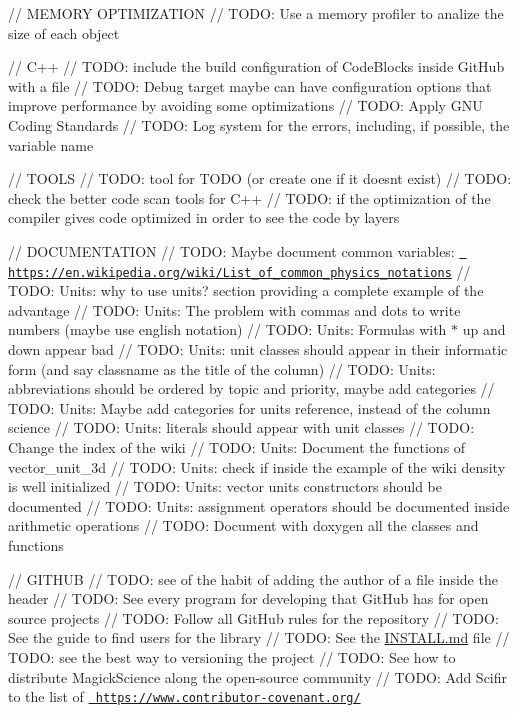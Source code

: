 // MEMORY OPTIMIZATION // TODO\+: Use a memory profiler to analize the size of each object

// C++ // TODO\+: include the build configuration of Code\+Blocks inside Git\+Hub with a file // TODO\+: Debug target maybe can have configuration options that improve performance by avoiding some optimizations // TODO\+: Apply GNU Coding Standards // TODO\+: Log system for the errors, including, if possible, the variable name

// TOOLS // TODO\+: tool for TODO (or create one if it doesn\textquotesingle{}t exist) // TODO\+: check the better code scan tools for C++ // TODO\+: if the optimization of the compiler gives code optimized in order to see the code by layers

// DOCUMENTATION // TODO\+: Maybe document common variables\+: \href{https://en.wikipedia.org/wiki/List_of_common_physics_notations}{\texttt{ https\+://en.\+wikipedia.\+org/wiki/\+List\+\_\+of\+\_\+common\+\_\+physics\+\_\+notations}} // TODO\+: Units\+: why to use units? section providing a complete example of the advantage // TODO\+: Units\+: The problem with commas and dots to write numbers (maybe use english notation) // TODO\+: Units\+: Formulas with $\ast$ up and down appear bad // TODO\+: Units\+: unit classes should appear in their informatic form (and say classname as the title of the column) // TODO\+: Units\+: abbreviations should be ordered by topic and priority, maybe add categories // TODO\+: Units\+: Maybe add categories for units reference, instead of the column science // TODO\+: Units\+: literals should appear with unit classes // TODO\+: Change the index of the wiki // TODO\+: Units\+: Document the functions of vector\+\_\+unit\+\_\+3d // TODO\+: Units\+: check if inside the example of the wiki density is well initialized // TODO\+: Units\+: vector units constructors should be documented // TODO\+: Units\+: assignment operators should be documented inside arithmetic operations // TODO\+: Document with doxygen all the classes and functions

// GITHUB // TODO\+: see of the habit of adding the author of a file inside the header // TODO\+: See every program for developing that Git\+Hub has for open source projects // TODO\+: Follow all Git\+Hub rules for the repository // TODO\+: See the guide to find users for the library // TODO\+: See the \mbox{\hyperlink{INSTALL_8md}{INSTALL.\+md}} file // TODO\+: see the best way to versioning the project // TODO\+: See how to distribute Magick\+Science along the open-\/source community // TODO\+: Add Scifir to the list of \href{https://www.contributor-covenant.org/}{\texttt{ https\+://www.\+contributor-\/covenant.\+org/}}

